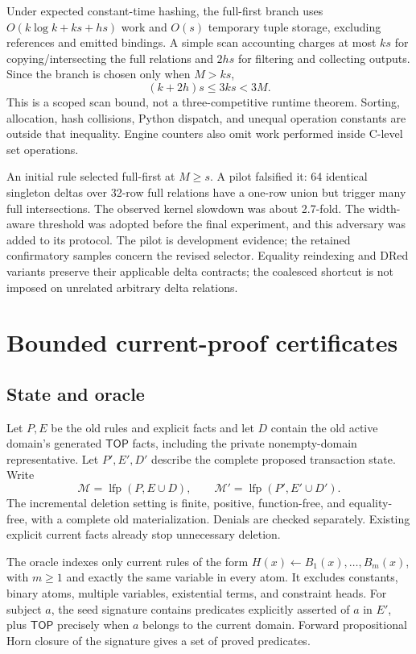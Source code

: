 \documentclass{article}
\newcommand{\lfp}{\operatorname{lfp}}
\newcommand{\TOP}{\mathsf{TOP}}
\begin{document}
Under expected constant-time hashing, the full-first branch uses
$O(k\log k+ks+hs)$ work and $O(s)$ temporary tuple storage, excluding references
and emitted bindings. A simple scan accounting charges at most $ks$ for
copying/intersecting the full relations and $2hs$ for filtering and collecting
outputs. Since the branch is chosen only when $M>ks$,
\begin{equation}
 (k+2h)s\leq 3ks<3M.
\end{equation}
This is a scoped scan bound, not a three-competitive runtime theorem. Sorting,
allocation, hash collisions, Python dispatch, and unequal operation constants
are outside that inequality. Engine counters also omit work performed inside
C-level set operations.

An initial rule selected full-first at $M\geq s$. A pilot falsified it: 64
identical singleton deltas over 32-row full relations have a one-row union but
trigger many full intersections. The observed kernel slowdown was about
2.7-fold. The width-aware threshold was adopted before the final experiment,
and this adversary was added to its protocol. The pilot is development evidence;
the retained confirmatory samples concern the revised selector. Equality
reindexing and DRed variants preserve their applicable delta contracts; the
coalesced shortcut is not imposed on unrelated arbitrary delta relations.

\section{Bounded current-proof certificates}
\subsection{State and oracle}
Let $P,E$ be the old rules and explicit facts and let $D$ contain the old active
domain's generated $\TOP$ facts, including the private nonempty-domain
representative. Let $P',E',D'$ describe the complete proposed transaction state.
Write
\begin{equation}
 \mathcal M=\lfp(P,E\cup D),\qquad
 \mathcal M'=\lfp(P',E'\cup D').
\end{equation}
The incremental deletion setting is finite, positive, function-free, and
equality-free, with a complete old materialization. Denials are checked
separately. Existing explicit current facts already stop unnecessary deletion.

The oracle indexes only current rules of the form
$H(x)\leftarrow B_1(x),\ldots,B_m(x)$, with $m\geq1$ and exactly the same
variable in every atom. It excludes constants, binary atoms, multiple variables,
existential terms, and constraint heads. For subject $a$, the seed signature
contains predicates explicitly asserted of $a$ in $E'$, plus $\TOP$ precisely
when $a$ belongs to the current domain. Forward propositional Horn closure of
the signature gives a set of proved predicates.
\end{document}
